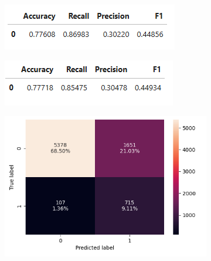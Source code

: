 \documentclass[12pt,a4paper]{article}
\begin{document}
	\begin{figure}[h]
		\centering
		\begin{subfigure}[t]{0.49\textwidth}
			\includegraphics[width=\textwidth]{dTree_train_perf.png}
			\caption{}
			\label{fig:dTree_train_perf}
		\end{subfigure}
		\hfill
		\begin{subfigure}[t]{0.49\textwidth}
			\includegraphics[width=\textwidth]{dTree_test_perf.png}
			\caption{}
			\label{fig:Tree_test_per}
		\end{subfigure}
		\begin{subfigure}[t]{0.47\textwidth}
			\includegraphics[width=\textwidth]{dTree_c_Matrix_train.png}
			\caption{}
			\label{fig:dTree_c_Matrix_trai}
		\end{subfigure}
		\hfill
		\begin{subfigure}[t]{0.45\textwidth}

\end{subfigure}
\end{figure}
\end{document}

